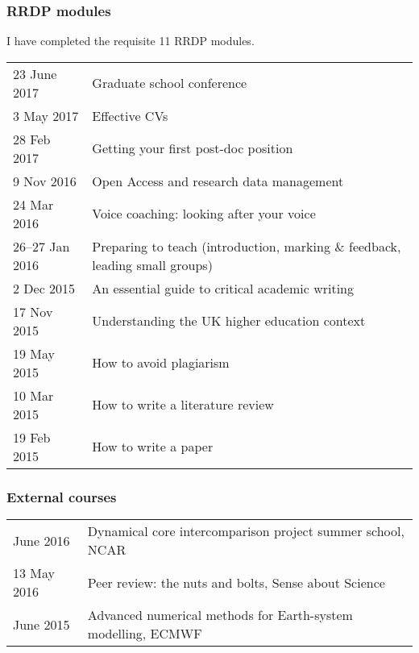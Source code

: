 \documentclass[a4paper,11pt]{article}
\begin{document}
\subsubsection*{RRDP modules}
I have completed the requisite 11 RRDP modules.

\vspace*{0.5em}
\begin{tabular}{l l}
23 June 2017    & Graduate school conference \\
3 May 2017	& Effective CVs \\
28 Feb 2017	& Getting your first post-doc position \\
9 Nov 2016      & Open Access and research data management \\
24 Mar 2016	& Voice coaching: looking after your voice \\
26--27 Jan 2016 & Preparing to teach (introduction, marking \& feedback, leading small groups) \\
2 Dec 2015	& An essential guide to critical academic writing \\
17 Nov 2015	& Understanding the UK higher education context \\
19 May 2015	& How to avoid plagiarism \\
10 Mar 2015	& How to write a literature review \\
19 Feb 2015	& How to write a paper \\
\end{tabular}

\subsubsection*{External courses}
\begin{tabular}{l l}
June 2016 & Dynamical core intercomparison project summer school, NCAR \\
13 May 2016 & Peer review: the nuts and bolts, Sense about Science \\
June 2015 & Advanced numerical methods for Earth-system modelling, ECMWF \\
\end{tabular}
\end{document}
